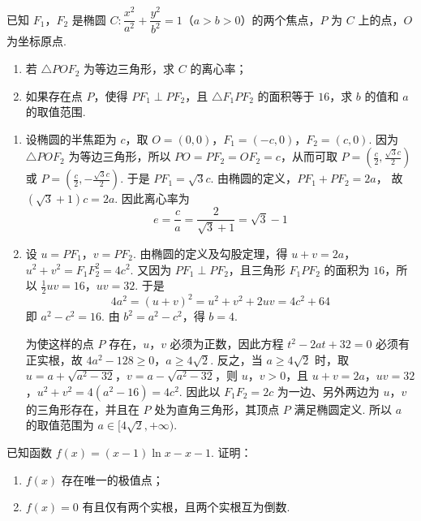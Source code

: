 \begin{problem}
已知 \(F_1\)，\(F_2\) 是椭圆 \(C:\dfrac{x^2}{a^2}+\dfrac{y^2}{b^2}=1\)（\(a>b>0\)）的两个焦点，\(P\) 为 \(C\) 上的点，\(O\) 为坐标原点.

\begin{enumerate}
\item 若 \(\triangle POF_2\) 为等边三角形，求 \(C\) 的离心率；
\item 如果存在点 \(P\)，使得 \(PF_1\perp PF_2\)，且 \(\triangle F_1PF_2\) 的面积等于 \(16\)，求 \(b\) 的值和 \(a\) 的取值范围.
\end{enumerate}
\end{problem}

\begin{solution}
\begin{enumerate}
\item 设椭圆的半焦距为 \(c\)，取 \(O=(0,0)\)，\(F_1=(-c,0)\)，\(F_2=(c,0)\). 因为 \(\triangle POF_2\) 为等边三角形，所以 \(PO=PF_2=OF_2=c\)，从而可取 \(P=\left(\frac{c}{2},\frac{\sqrt3c}{2}\right)\) 或 \(P=\left(\frac{c}{2},-\frac{\sqrt3c}{2}\right)\). 于是 \(PF_1=\sqrt3c\). 由椭圆的定义，\(PF_1+PF_2=2a\)，
故 \((\sqrt3+1)c=2a\). 因此离心率为
\[
e=\frac{c}{a}=\frac{2}{\sqrt3+1}=\sqrt3-1
\]

\item 设 \(u=PF_1\)，\(v=PF_2\). 由椭圆的定义及勾股定理，得
\(u+v=2a\)，\(u^2+v^2=F_1F_2^2=4c^2\).
又因为 \(PF_1\perp PF_2\)，且三角形 \(F_1PF_2\) 的面积为 \(16\)，所以
\(\frac12uv=16\)，\(uv=32\).
于是
\[
4a^2=(u+v)^2=u^2+v^2+2uv=4c^2+64
\]
即 \(a^2-c^2=16\). 由 \(b^2=a^2-c^2\)，得 \(b=4\).

为使这样的点 \(P\) 存在，\(u\)，\(v\) 必须为正数，因此方程
\(t^2-2at+32=0\)
必须有正实根，故
\(4a^2-128\ge0\)，\(a\ge4\sqrt2\).
反之，当 \(a\ge4\sqrt2\) 时，取 \(u=a+\sqrt{a^2-32}\)，\(v=a-\sqrt{a^2-32}\)，则 \(u\)，\(v>0\)，且
\(u+v=2a\)，\(uv=32\)，\(u^2+v^2=4(a^2-16)=4c^2\).
因此以 \(F_1F_2=2c\) 为一边、另外两边为 \(u\)，\(v\) 的三角形存在，并且在 \(P\) 处为直角三角形，其顶点 \(P\) 满足椭圆定义. 所以 \(a\) 的取值范围为
\(a\in[4\sqrt2,+\infty)\).
\end{enumerate}
\end{solution}

\begin{problem}
已知函数 \(f(x)=(x-1)\ln x-x-1\). 证明：

\begin{enumerate}
\item \(f(x)\) 存在唯一的极值点；
\item \(f(x)=0\) 有且仅有两个实根，且两个实根互为倒数.
\end{enumerate}
\end{problem}

